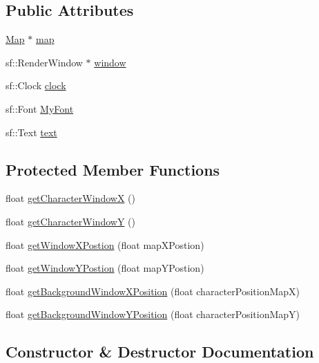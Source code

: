\subsection*{Public Attributes}
\begin{DoxyCompactItemize}
\item 
\hyperlink{class_map}{Map} $\ast$ \hyperlink{class_display_map_manager_aefa663d75781e47edfc5629e3652ead8}{map}
\item 
sf\+::\+Render\+Window $\ast$ \hyperlink{class_display_map_manager_a880f01a1287f35cc4852c2e5d58ecd24}{window}
\item 
sf\+::\+Clock \hyperlink{class_display_map_manager_ad04d2e96cd8ba8f1cbcf3425bd28cfc5}{clock}
\item 
sf\+::\+Font \hyperlink{class_display_map_manager_af1ea34885ea77010e9a99b6a49da5e58}{My\+Font}
\item 
sf\+::\+Text \hyperlink{class_display_map_manager_ad9a89d13fbf1ac95fbb058b565bb4d2f}{text}
\end{DoxyCompactItemize}
\subsection*{Protected Member Functions}
\begin{DoxyCompactItemize}
\item 
float \hyperlink{class_display_map_manager_a9f3a6841688b7e4932ca1269588d4504}{get\+Character\+WindowX} ()
\item 
float \hyperlink{class_display_map_manager_a4a17bf69eb158d10c6af0b5467735d60}{get\+Character\+WindowY} ()
\item 
float \hyperlink{class_display_map_manager_af26ef96ab1e1e2c33e9160a8a66263f7}{get\+Window\+X\+Postion} (float map\+X\+Postion)
\item 
float \hyperlink{class_display_map_manager_ad850ee0bd93bab3cf376ce343eabfff0}{get\+Window\+Y\+Postion} (float map\+Y\+Postion)
\item 
float \hyperlink{class_display_map_manager_a12847fea83dc76f47255605f7de3d020}{get\+Background\+Window\+X\+Position} (float character\+Position\+MapX)
\item 
float \hyperlink{class_display_map_manager_a7326948a0f1ef16c89a27f5bde09192b}{get\+Background\+Window\+Y\+Position} (float character\+Position\+MapY)
\end{DoxyCompactItemize}


\subsection{Constructor \& Destructor Documentation}
\mbox{\label{class_display_map_manager_acca16727ef15d478af88df1acb8a1c89}} 
